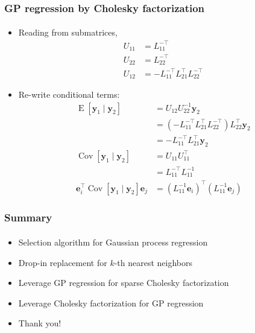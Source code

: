 \documentclass{beamer}                             %
\renewcommand{\vec}[1]{\bm{#1}}
\renewcommand{\vec}[1]{\bm{#1}}
\DeclareMathOperator{\E}{E}
\DeclareMathOperator{\Cov}{Cov}
\begin{document}
\begin{frame}
\frametitle{GP regression by Cholesky factorization}
\framesubtitle{}
\begin{itemize}
  \item<+-> Reading from submatrices,
    \begin{align*}
      U_{11} &= L_{11}^{-\top} \\
      U_{22} &= L_{22}^{-\top} \\
      U_{12} &= -L_{11}^{-\top} L_{21}^{\top} L_{22}^{-\top}
    \end{align*}
  \item<+-> Re-write conditional terms:
    \begin{align*}
      \E[\vec{y}_1 \mid \vec{y}_2] &= U_{12} U_{22}^{-1} \vec{y}_2 \\
      &= (-L_{11}^{-\top} L_{21}^{\top} L_{22}^{-\top})
        L_{22}^{\top} \vec{y}_2 \\
      &= -L_{11}^{-\top} L_{21}^{\top} \vec{y}_2 \\
      \Cov[\vec{y}_1 \mid \vec{y}_2] &= U_{11} U_{11}^{\top} \\
      &= L_{11}^{-\top} L_{11}^{-1} \\
      \vec{e}_i^{\top} \Cov[\vec{y}_1 \mid \vec{y}_2] \vec{e}_j &=
        (L_{11}^{-1} \vec{e}_i)^{\top} (L_{11}^{-1} \vec{e}_j)
    \end{align*}
\end{itemize}
\end{frame}

\begin{frame}
\frametitle{Summary}
\framesubtitle{}
\begin{itemize}
  \item Selection algorithm for Gaussian process regression
  \item Drop-in replacement for \( k \)-th nearest neighbors
  \item Leverage GP regression for sparse Cholesky factorization
  \item Leverage Cholesky factorization for GP regression
  \item Thank you!
\end{itemize}
\end{frame}
\end{document}
